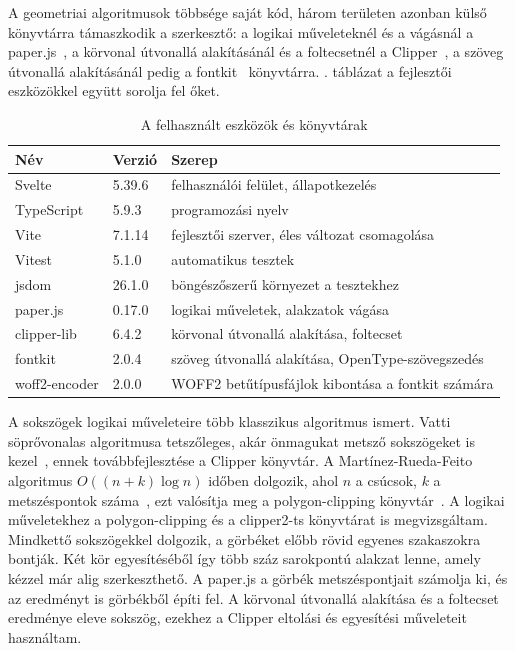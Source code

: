A geometriai algoritmusok többsége saját kód, három területen azonban külső könyvtárra támaszkodik a szerkesztő: a logikai műveleteknél és a vágásnál a paper.js~\cite{paperjs}, a körvonal útvonallá alakításánál és a foltecsetnél a Clipper~\cite{clipper}, a szöveg útvonallá alakításánál pedig a fontkit~\cite{fontkit} könyvtárra. . táblázat a fejlesztői eszközökkel együtt sorolja fel őket.

\begin{table}[!ht]
\caption{A felhasznált eszközök és könyvtárak}
\label{tab:versions}
\centering
\footnotesize
\begin{tabular}{|l|l|>{\raggedright\arraybackslash}p{}|}
\hline
\textbf{Név} & \textbf{Verzió} & \textbf{Szerep} \\ \hline
Svelte & 5.39.6 & felhasználói felület, állapotkezelés \\ \hline
TypeScript & 5.9.3 & programozási nyelv \\ \hline
Vite & 7.1.14 & fejlesztői szerver, éles változat csomagolása \\ \hline
Vitest & 5.1.0 & automatikus tesztek \\ \hline
jsdom & 26.1.0 & böngészőszerű környezet a tesztekhez \\ \hline
paper.js & 0.17.0 & logikai műveletek, alakzatok vágása \\ \hline
clipper-lib & 6.4.2 & körvonal útvonallá alakítása, foltecset \\ \hline
fontkit & 2.0.4 & szöveg útvonallá alakítása, OpenType-szövegszedés \\ \hline
woff2-encoder & 2.0.0 & WOFF2 betűtípusfájlok kibontása a fontkit számára \\ \hline
\end{tabular}
\end{table}

A sokszögek logikai műveleteire több klasszikus algoritmus ismert. Vatti söprővonalas algoritmusa tetszőleges, akár önmagukat metsző sokszögeket is kezel~\cite{vatti1992}, ennek továbbfejlesztése a Clipper könyvtár. A Martínez-Rueda-Feito algoritmus $O((n+k)\log n)$ időben dolgozik, ahol $n$ a csúcsok, $k$ a metszéspontok száma~\cite{martinez2009}, ezt valósítja meg a polygon-clipping könyvtár~\cite{polygon-clipping}. A logikai műveletekhez a polygon-clipping és a clipper2-ts könyvtárat is megvizsgáltam. Mindkettő sokszögekkel dolgozik, a görbéket előbb rövid egyenes szakaszokra bontják. Két kör egyesítéséből így több száz sarokpontú alakzat lenne, amely kézzel már alig szerkeszthető. A paper.js a görbék metszéspontjait számolja ki, és az eredményt is görbékből építi fel. A körvonal útvonallá alakítása és a foltecset eredménye eleve sokszög, ezekhez a Clipper eltolási és egyesítési műveleteit használtam.

